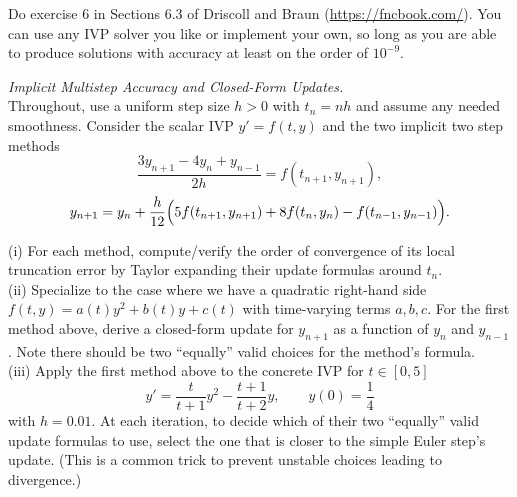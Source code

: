 \documentclass[11pt]{article}
\begin{document}
\vskip1cm

  Do exercise 6 in Sections 6.3 of Driscoll and Braun (\url{https://fncbook.com/}). You can use any IVP solver you like or implement your own, so long as you are able to produce solutions with accuracy at least on the order of $10^{-9}$.


\vskip1cm

 {\it Implicit Multistep Accuracy and Closed-Form Updates.}\\
Throughout, use a uniform step size \(h>0\) with \(t_{n}=nh\) and assume any needed smoothness.
Consider the scalar IVP \(y'=f(t,y)\) and the two implicit two step methods
\[
\frac{3y_{n+1}-4y_{n}+y_{n-1}}{2h}=f(t_{n+1},y_{n+1}),
\]
\[
y_{n+1}=y_{n}+\frac{h}{12}\Bigl(5f(t_{n+1},y_{n+1})+8f(t_{n},y_{n})-f(t_{n-1},y_{n-1})\Bigr).
\]

\noindent (i) For each method, compute/verify the order of convergence of its local truncation error by Taylor expanding their update formulas around $t_n$.\\

\noindent (ii) Specialize to the case where we have a quadratic right-hand side \(f(t,y)=a(t)y^{2}+b(t)y+c(t)\) with time-varying terms \(a,b,c\). For the first method above, derive a closed-form update for $y_{n+1}$ as a function of $y_{n}$ and $y_{n-1}$. Note there should be two ``equally'' valid choices for the method's formula.\\

\noindent (iii) Apply the first method above to the concrete IVP for $t\in [0,5]$
\[
y'=\frac{t}{t+1}y^{2}-\frac{t+1}{t+2}y,\qquad y(0)=\frac14
\]
with $h=0.01$. At each iteration, to decide which of their two ``equally'' valid update formulas to use, select the one that is closer to the simple Euler step's update. (This is a common trick to prevent unstable choices leading to divergence.)
\end{document}
